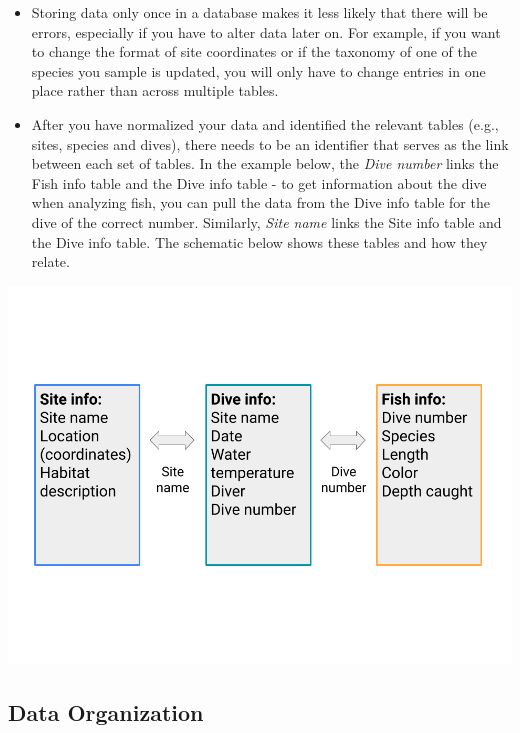 \documentclass[
]{book}
\providecommand{\tightlist}{%
  \setlength{\itemsep}{0pt}\setlength{\parskip}{0pt}}
\begin{document}
\begin{enumerate}
\begin{itemize}
    \begin{itemize}
    \tightlist
    \item
      Storing data only once in a database makes it less likely that there will be errors, especially if you have to alter data later on. For example, if you want to change the format of site coordinates or if the taxonomy of one of the species you sample is updated, you will only have to change entries in one place rather than across multiple tables.
    \item
      After you have normalized your data and identified the relevant tables (e.g., sites, species and dives), there needs to be an identifier that serves as the link between each set of tables. In the example below, the \emph{Dive number} links the Fish info table and the Dive info table - to get information about the dive when analyzing fish, you can pull the data from the Dive info table for the dive of the correct number. Similarly, \emph{Site name} links the Site info table and the Dive info table. The schematic below shows these tables and how they relate.
    \end{itemize}
  \end{itemize}
\end{enumerate}

\includegraphics{images/M2S3_normalization_data_tables.png}

\hypertarget{data-organization}{%
\subsection{Data Organization}\label{data-organization}}
\end{document}
